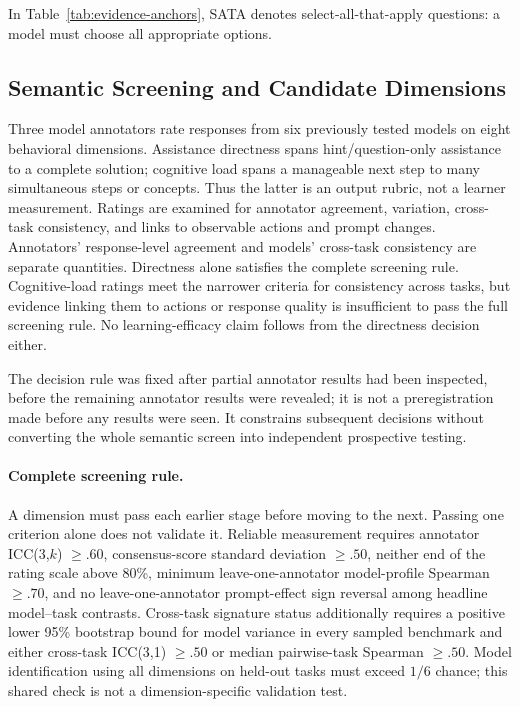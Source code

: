 In Table~\ref{tab:evidence-anchors}, SATA denotes select-all-that-apply
questions: a model must choose all appropriate options.


\subsection{Semantic Screening and Candidate Dimensions}

Three model annotators rate responses from six previously tested models
on eight behavioral dimensions. Assistance directness spans
hint/question-only assistance to a complete solution; cognitive load spans a
manageable next step to many simultaneous steps or concepts. Thus the latter
is an output rubric, not a learner measurement. Ratings are examined for annotator
agreement, variation, cross-task consistency, and links to observable actions
and prompt changes. Annotators' response-level agreement and models' cross-task
consistency are separate quantities. Directness alone satisfies the complete
screening rule. Cognitive-load ratings meet the narrower criteria for consistency across
tasks, but evidence linking them to actions or response quality is insufficient
to pass the full screening rule. No learning-efficacy claim follows
from the directness decision either.

The decision rule was fixed after partial annotator results had been inspected,
before the remaining annotator results were revealed; it is not a preregistration made before any results were seen. It constrains subsequent decisions without converting the
whole semantic screen into independent prospective testing.

\paragraph{Complete screening rule.}
A dimension must pass each earlier stage before moving to the next. Passing
one criterion alone does not validate it. Reliable measurement requires annotator ICC(3,$k$)
$\geq .60$, consensus-score standard deviation $\geq .50$, neither end of the rating scale above 80\%,
minimum leave-one-annotator model-profile Spearman $\geq .70$, and no
leave-one-annotator prompt-effect sign reversal among headline model--task
contrasts. Cross-task signature status additionally requires a positive lower
95\% bootstrap bound for model variance in every sampled benchmark and either
cross-task ICC(3,1) $\geq .50$ or median pairwise-task Spearman $\geq .50$.
Model identification using all dimensions on held-out tasks must exceed $1/6$ chance; this shared
check is not a dimension-specific validation test.

